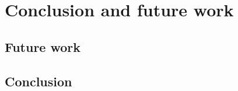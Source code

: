 \chapter{Conclusion and future work}\label{ch:conclusion-and-future-work}

\section{Future work}\label{sec:future-work}

\section{Conclusion}\label{sec:conclusion}
